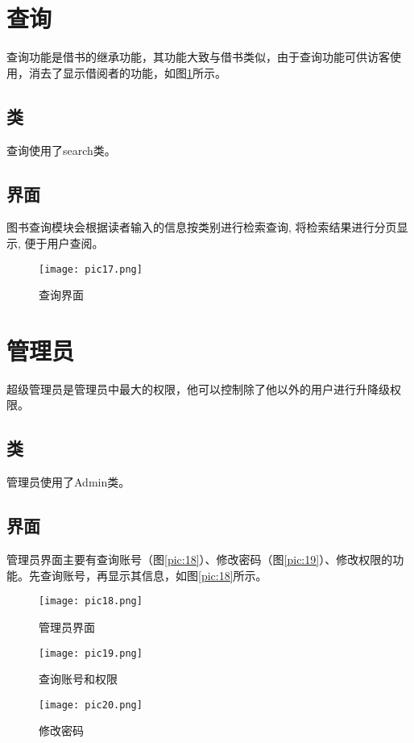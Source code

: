 \documentclass[forprint]{shmtu}
\begin{document}
\section{查询}

查询功能是借书的继承功能，其功能大致与借书类似，由于查询功能可供访客使用，消去了显示借阅者的功能，如图\ref{pic:17}所示。

\subsection{类}

查询使用了search类。

\subsection{界面}

图书查询模块会根据读者输入的信息按类别进行检索查询, 将检索结果进行分页显示, 便于用户查阅。

\begin{figure}[!htbp]
	\centering
	\texttt{[image: pic17.png]}
	\caption{查询界面}
	\label{pic:17}
\end{figure}

\section{管理员}

超级管理员是管理员中最大的权限，他可以控制除了他以外的用户进行升降级权限。

\subsection{类}

管理员使用了Admin类。

\subsection{界面}

管理员界面主要有查询账号（图\ref{pic:18}）、修改密码（图\ref{pic:19}）、修改权限的功能。先查询账号，再显示其信息，如图\ref{pic:18}所示。

\begin{figure}[!htbp]
	\centering
	\begin{minipage}[!htbp]{0.33\linewidth}
		\centering
		\texttt{[image: pic18.png]}
		\caption{管理员界面}
		\label{pic:18}
	\end{minipage}%
	\begin{minipage}[!htbp]{0.33\linewidth}
		\centering
		\texttt{[image: pic19.png]}
		\caption{查询账号和权限}
		\label{pic:19}
	\end{minipage}%
	\begin{minipage}[!htbp]{0.33\linewidth}
		\centering
		\texttt{[image: pic20.png]}
		\caption{修改密码}
		\label{pic:20}
	\end{minipage}%
\end{figure}
\end{document}
